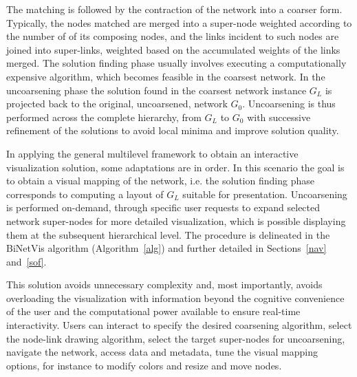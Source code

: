 \documentclass[runningheads]{llncs}
\begin{document}
The matching is followed by the contraction of the network into a coarser form.
Typically, the nodes matched are merged into a super-node weighted according to the number of of its composing nodes, and the links incident to such nodes are joined into super-links,
weighted based on the accumulated weights of the links merged.
The solution finding phase usually involves executing a computationally expensive algorithm, which becomes feasible in the coarsest network. In the uncoarsening phase the solution found in the coarsest network instance $G_L$ is projected back to the original, uncoarsened, network $G_0$. Uncoarsening is thus performed across the complete hierarchy, from $G_L$ to $G_0$ with successive refinement of the solutions to avoid local minima and improve solution quality.

In applying the general multilevel framework to obtain an interactive visualization solution, some adaptations are in order.  
In this scenario the goal is to obtain a visual mapping of the network, i.e. the solution finding phase corresponds to computing a layout of $G_L$ suitable for presentation.  Uncoarsening is performed  on-demand, through specific user requests
to expand selected network super-nodes for more detailed visualization, which is possible displaying them at the subsequent hierarchical level. The procedure is delineated in the BiNetVis algorithm (Algorithm~\ref{alg}) and further detailed in Sections~\ref{nav} and~\ref{sof}.

This solution avoids unnecessary complexity and, most importantly, avoids overloading the visualization with information beyond the cognitive convenience of the user and the computational power available to ensure real-time interactivity.
Users can interact to specify the desired coarsening algorithm, select the node-link drawing algorithm, select the target super-nodes for uncoarsening, navigate the network, access data and metadata, tune the visual mapping options, for instance to modify colors and resize and move nodes. 
\end{document}

